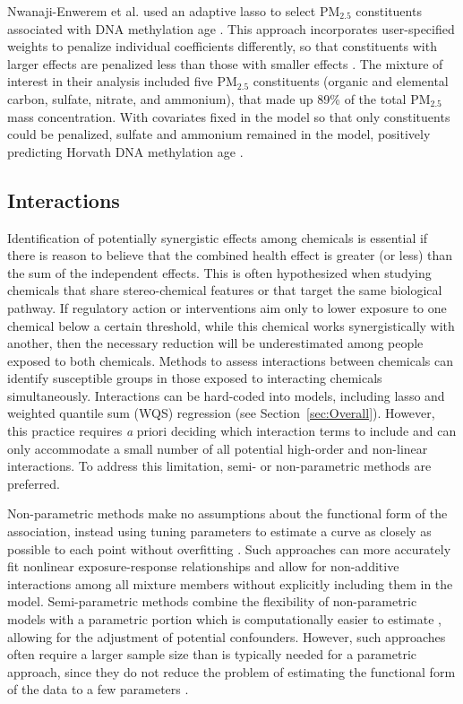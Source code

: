 Nwanaji-Enwerem et al. used an adaptive lasso to select PM$_{2.5}$ constituents associated with DNA methylation age \citep{nwanaji2017associations}. This approach incorporates user-specified weights to penalize individual coefficients differently, so that constituents with larger effects are penalized less than those with smaller effects \citep{zou2006adaptive}. The mixture of interest in their analysis included five PM$_{2.5}$ constituents (organic and elemental carbon, sulfate, nitrate, and ammonium), that made up 89\% of the total PM$_{2.5}$ mass concentration. With covariates fixed in the model so that only constituents could be penalized, sulfate and ammonium remained in the model, positively predicting Horvath DNA methylation age \citep{nwanaji2017associations}.

\subsection{Interactions}\label{sec:Interact}

Identification of potentially synergistic effects among chemicals is essential if there is reason to believe that the combined health effect is greater (or less) than the sum of the independent effects. This is often hypothesized when studying chemicals that share stereo-chemical features or that target the same biological pathway. If regulatory action or interventions aim only to lower exposure to one chemical below a certain threshold, while this chemical works synergistically with another, then the necessary reduction will be underestimated among people exposed to both chemicals. Methods to assess interactions between chemicals can identify susceptible groups in those exposed to interacting chemicals simultaneously. Interactions can be hard-coded into models, including lasso and weighted quantile sum (WQS) regression (see Section~\ref{sec:Overall}). However, this practice requires {\textit a priori} deciding which interaction terms to include and can only accommodate a small number of all potential high-order and non-linear interactions. To address this limitation, semi- or non-parametric methods are preferred.

Non-parametric methods make no assumptions about the functional form of the association, instead using tuning parameters to estimate a curve as closely as possible to each point without overfitting \citep{ISLR}. Such approaches can more accurately fit nonlinear exposure-response relationships and allow for non-additive interactions among all mixture members without explicitly including them in the model. Semi-parametric methods combine the flexibility of non-parametric models with a parametric portion which is computationally easier to estimate \citep{friedman2001elements}, allowing for the adjustment of potential confounders. However, such approaches often require a larger sample size than is typically needed for a parametric approach, since they do not reduce the problem of estimating the functional form of the data to a few parameters \citep{ISLR}.

